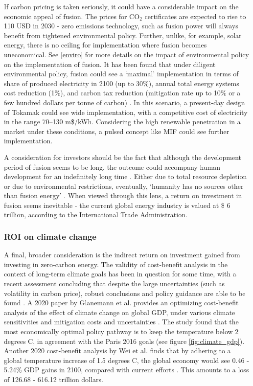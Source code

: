 If carbon pricing is taken seriously, it could have a considerable impact on the economic appeal of fusion. The prices for CO$_2$ certificates are expected to rise to 110 USD in 2030 - zero emissions technology, such as fusion power will always benefit from tightened environmental policy. Further, unlike, for example, solar energy, there is no ceiling for implementation where fusion becomes uneconomical.  See \ref{enviro} for more details on the impact of environmental policy on the implementation of fusion. It has been found that under diligent environmental policy, fusion could see a ‘maximal’ implementation in terms of share of produced electricity in 2100 (up to 30\%), annual total energy systems cost reduction (1\%), and carbon tax reduction (mitigation rate up to 10\% or a few hundred dollars per tonne of carbon) \cite{tokimatsu2003role}. In this scenario, a present-day design of Tokamak could see wide implementation, with a competitive cost of electricity in the range 70–130 m\$/kWh. Considering the high renewable penetration in a market under these conditions, a pulsed concept like MIF could see further implementation.

A consideration for investors should be the fact that although the development period of fusion seems to be long, the outcome could accompany human development for an indefinitely long time \cite{roncaglia1989research}. Either due to total resource depletion or due to environmental restrictions, eventually, ‘humanity has no sources other than fusion energy’ \cite{arutyunov2017energy}. When viewed through this lens, a return on investment in fusion seems inevitable - the current global energy industry is valued at \$ 6 trillion, according to the International Trade Administration. 

\subsubsection{ROI on climate change}

A final, broader consideration is the indirect return on investment gained from investing in zero-carbon energy. The validity of cost-benefit analysis in the context of long-term climate goals has been in question for some time, with a recent assessment concluding that despite the large uncertainties (such as volatility in carbon price), robust conclusions and policy guidance are able to be found \cite{ekholm2018climatic}. A 2020 paper by Glanemann et al. provides an optimizing cost-benefit analysis of the effect of climate change on global GDP, under various climate sensitivities and mitigation costs and uncertainties \cite{glanemann2020paris}. The study found that the most economically optimal policy pathway is to keep the temperature below 2 degrees C, in agreement with the Paris 2016 goals (see figure \ref{fig:climate_gdp}). Another 2020 cost-benefit analysis by Wei et al. finds that by adhering to a global temperature increase of 1.5 degrees C, the global economy would see 0.46 - 5.24\% GDP gains in 2100, compared with current efforts \cite{wei2020self}. This amounts to a loss of 126.68 - 616.12 trillion dollars.

